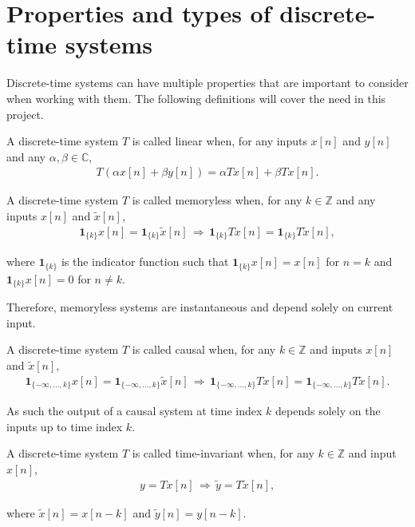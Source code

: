 \section{Properties and types of discrete-time systems}\label{sec:properties_DTS}
Discrete-time systems can have multiple properties that are important to consider when working with them. The following definitions will cover the need in this project.
\begin{definition}\label{def:linear_system}
A discrete-time system $T$ is called linear when, for any inputs $x[n]$ and $y[n]$ and any $\alpha,\beta\in\mathbb{C}$,
\begin{align}
T(\alpha x[n] + \beta y[n]) = \alpha T x[n] + \beta T x[n].
\end{align}
\end{definition}

\begin{definition}\label{def:memoryless_system}
A discrete-time system $T$ is called memoryless when, for any $k\in\mathbb{Z}$ and any inputs $x[n]$ and $\tilde{x}[n]$,
\begin{align}
\mathbf{1}_{\{k\}}x[n] = \mathbf{1}_{\{k\}}\tilde{x}[n] \, \Rightarrow \, \mathbf{1}_{\{k\}} T x[n] = \mathbf{1}_{\{k\}}T\tilde{x}[n],
\end{align}

where $\mathbf{1}_{\{k\}}$ is the indicator function such that $\mathbf{1}_{\{k\}}x[n]=x[n]$ for $n=k$ and $\mathbf{1}_{\{k\}}x[n]=0$ for $n \neq k$.
\end{definition}

Therefore, memoryless systems are instantaneous and depend solely on current input.

\begin{definition}\label{def:causal_system}
A discrete-time system $T$ is called causal when, for any $k\in\mathbb{Z}$ and inputs $x[n]$ and $\tilde{x}[n]$,
\begin{align}
\mathbf{1}_{\{-\infty,\ldots,k\}} x[n] = \mathbf{1}_{\{-\infty,\ldots,k\}} \tilde{x}[n] \, \Rightarrow \, \mathbf{1}_{\{-\infty,\ldots,k\}} Tx[n] = \mathbf{1}_{\{-\infty,\ldots,k\}} T\tilde{x}[n].
\end{align}
\end{definition}

As such the output of a causal system at time index $k$ depends solely on the inputs up to time index $k$.

\begin{definition}\label{def:time_invariant_system}
A discrete-time system $T$ is called time-invariant when, for any $k\in\mathbb{Z}$ and input $x[n]$,
\begin{align}
y = Tx[n] \, \Rightarrow \, \tilde{y} = T\tilde{x}[n],
\end{align}

where $\tilde{x}[n] = x[n-k]$ and $\tilde{y}[n] = y[n-k]$.
\end{definition}

